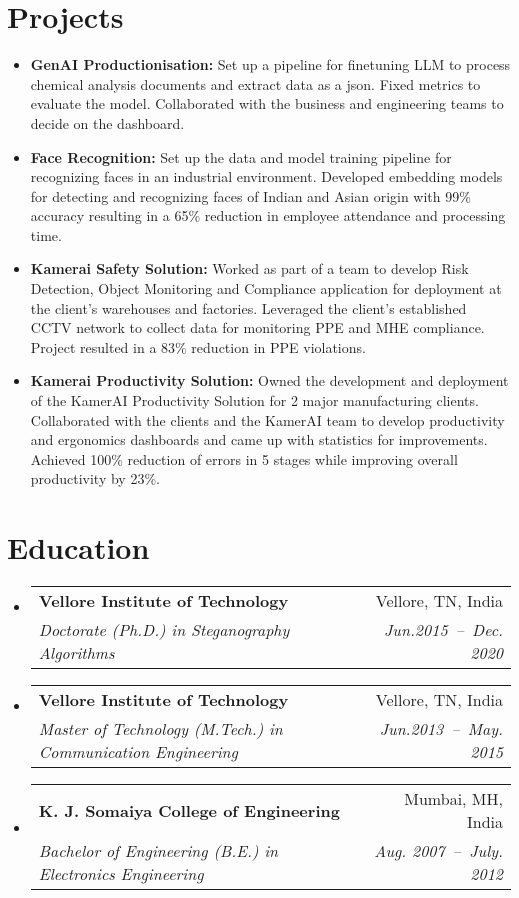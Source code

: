 \documentclass[a4paper,11pt]{article}
\makeatletter
\newcommand{\resumeSubheading}[4]{
  \vspace{-1pt}\item
    \begin{tabular*}{0.97\textwidth}[t]{l@{\extracolsep{\fill}}r}
      \textbf{#1} & #2 \\
      \textit{\small#3} & \textit{\small #4} \\
    \end{tabular*}\vspace{-5pt}
}
\newcommand{\resumeSubHeadingListStart}{\begin{itemize}[leftmargin=*]}
\newcommand{\resumeSubHeadingListEnd}{\end{itemize}}
\makeatother
\begin{document}
\section{Projects}
  \begin{itemize}[leftmargin=*, itemsep = -2pt]
    \item {\textbf{GenAI Productionisation:}} Set up a pipeline for finetuning LLM to process chemical analysis documents and extract data as a json. Fixed metrics to evaluate the model. Collaborated with the business and engineering teams to decide on the dashboard.
    \item {\textbf{Face Recognition:} Set up the data and model training pipeline for recognizing faces in an industrial environment. Developed embedding models for detecting and recognizing faces of Indian and Asian origin with 99\% accuracy resulting in a 65\% reduction in employee attendance and processing time.}
    \item {\textbf{Kamerai Safety Solution:} Worked as part of a team to develop Risk Detection, Object Monitoring and Compliance application for deployment at the client's warehouses and factories. Leveraged the client's established CCTV network to collect data for monitoring PPE and MHE compliance. Project resulted in a 83\% reduction in PPE violations.}
    \item {\textbf{Kamerai Productivity Solution:} Owned the development and deployment of the KamerAI Productivity Solution for 2 major manufacturing clients. Collaborated with the clients and the KamerAI team to develop productivity and ergonomics dashboards and came up with statistics for improvements. Achieved 100\% reduction of errors in 5 stages while improving overall productivity by 23\%.}
  \end{itemize}

\section{Education}
  \resumeSubHeadingListStart
    \resumeSubheading
      {Vellore Institute of Technology}{Vellore, TN, India}
      {Doctorate (Ph.D.) in Steganography Algorithms}{Jun.2015~--~Dec. 2020}
    \resumeSubheading
      {Vellore Institute of Technology}{Vellore, TN, India}
      {Master of Technology (M.Tech.) in Communication Engineering}{Jun.2013~--~May. 2015}
    \resumeSubheading
      {K. J. Somaiya College of Engineering}{Mumbai, MH, India}
      {Bachelor of Engineering (B.E.) in Electronics Engineering}{Aug. 2007~--~July. 2012}
  \resumeSubHeadingListEnd
\end{document}
